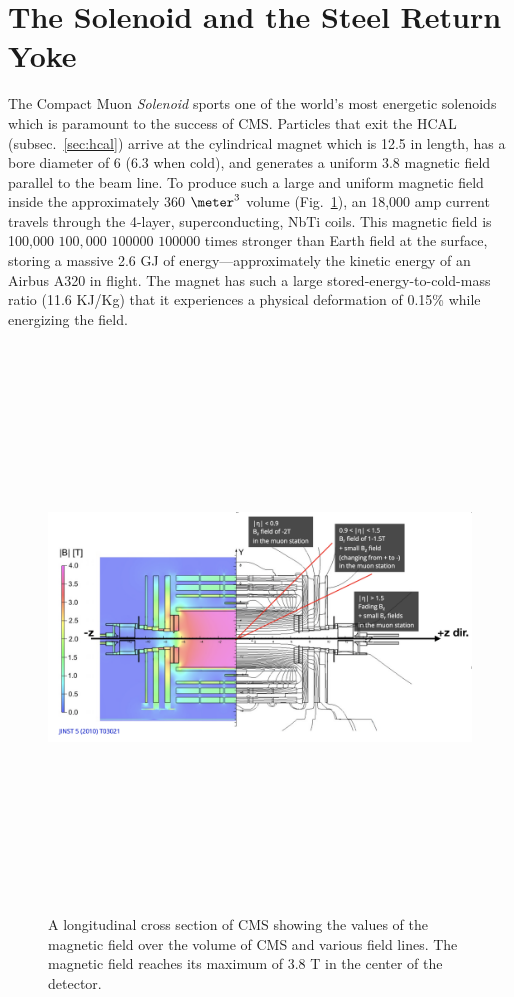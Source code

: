 \section{The Solenoid and the Steel Return Yoke}
\label{sec:solenoid}

The Compact Muon \emph{Solenoid} sports one of the world's most energetic solenoids which is paramount to the success of CMS.
Particles that exit the HCAL (subsec.~\ref{sec:hcal}) arrive at the cylindrical magnet which is 12.5 \meter in length, has a bore diameter of 6 \meter (6.3 \meter when cold), and generates a uniform 3.8 \tesla magnetic field parallel to the beam line.
To produce such a large and uniform magnetic field inside the approximately 360 $\meter^3$ volume (Fig.~\ref{fig:cms_magnetic_field}), an 18,000 amp current travels through the 4-layer, superconducting, NbTi coils.
This magnetic field is 100,000 $100,000$  $100000$ $100 000$ times stronger than Earth field at the surface, storing a massive 2.6 GJ of energy---approximately the kinetic energy of an Airbus A320 in flight.
The magnet has such a large stored-energy-to-cold-mass ratio (11.6 KJ/Kg) that it experiences a physical deformation of 0.15\% while energizing the field.
\begin{figure}[pbth]
    \centering
    \includegraphics[width=15cm,height=15cm,keepaspectratio]{figures/cms/solenoid/CMS_longitudinal_view_magnetic_field.png}
        \caption{
        A longitudinal cross section of CMS showing the values of the magnetic field over the volume of CMS and various field lines. 
        The magnetic field reaches its maximum of 3.8 T in the center of the detector.}
        \label{fig:cms_magnetic_field}
    \end{figure}

